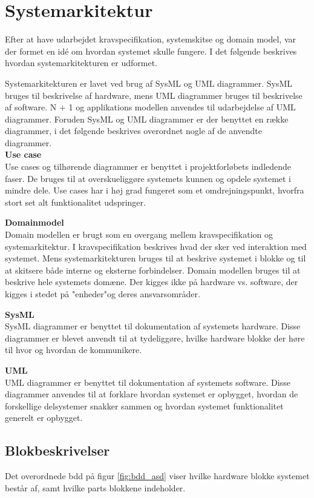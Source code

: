 \section{Systemarkitektur}
\label{chap:systemarkitektur}

Efter at have udarbejdet kravspecifikation, systemskitse og domain model, var der formet en idé om hvordan systemet skulle fungere. I det følgende beskrives hvordan systemarkitekturen er udformet. 

Systemarkitekturen er lavet ved brug af SysML og UML diagrammer. SysML bruges til beskrivelse af hardware, mens UML diagrammer bruges til beskrivelse af software. N + 1 og applikations modellen anvendes til udarbejdelse af UML diagrammer. Foruden SysML og UML diagrammer er der benyttet en række diagrammer, i det følgende beskrives overordnet nogle af de anvendte diagrammer.\\

\textbf{Use case}\\
Use cases og tilhørende diagrammer er benyttet i projektforløbets indledende faser. De bruges til at overskueliggøre systemets kunnen og opdele systemet i mindre dele. Use cases har i høj grad fungeret som et omdrejningspunkt, hvorfra stort set alt funktionalitet udspringer.

\textbf{Domainmodel}\\
Domain modellen er brugt som en overgang mellem kravspecifikation og systemarkitektur.
I kravspecifikation beskrives hvad der sker ved interaktion med systemet. Mens
systemarkitekturen bruges til at beskrive systemet i blokke og til at skitsere både interne
og eksterne forbindelser. Domain modellen bruges til at beskrive hele systemets domæne.
Der kigges ikke på hardware vs. software, der kigges i stedet på "enheder"og deres
ansvarsområder.

\textbf{SysML}\\
SysML diagrammer er benyttet til dokumentation af systemets hardware. Disse diagrammer er blevet anvendt til at tydeliggøre, hvilke hardware blokke der høre til hvor og hvordan de kommunikere.  

\textbf{UML}\\
UML diagrammer er benyttet til dokumentation af systemets software. Disse diagrammer anvendes til at forklare hvordan systemet er opbygget, hvordan de forskellige delsystemer snakker sammen og hvordan systemet funktionalitet generelt er opbygget.

\newpage
 
\subsection{Blokbeskrivelser}
Det overordnede bdd på figur \ref{fig:bdd_asd} viser hvilke hardware blokke systemet består af, samt hvilke parts blokkene indeholder.

